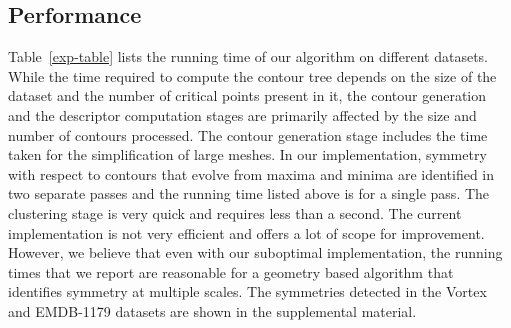 \documentclass[review,journal]{vgtc}         %
\begin{document}
\subsection{Performance}
Table~\ref{exp-table} lists the running time of our algorithm on different datasets. While the
time required to compute the contour tree depends on the size of the dataset and the number of
critical points present in it, the contour generation and the descriptor computation stages
are primarily affected by the size and number of contours processed. The contour
generation stage includes the time taken for the simplification of large meshes. 
In our implementation, symmetry with respect to contours that evolve from maxima and minima 
are identified in two separate passes and the running time listed above is for a single pass.
The clustering stage is very quick and requires less than a second.
The current implementation is not very efficient and offers a lot of scope for improvement.
However, we believe that even with our suboptimal implementation, the running times that 
we report are reasonable for a geometry based algorithm that identifies
symmetry at multiple scales. The symmetries detected in the Vortex and EMDB-1179 datasets
are shown in the supplemental material.
\end{document}

